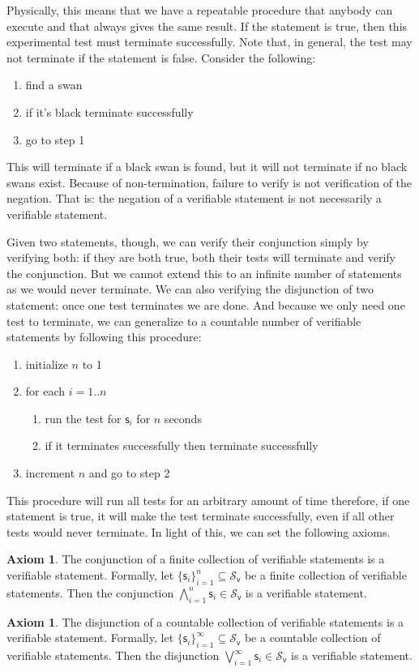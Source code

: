 \documentclass[letterpaper]{article}
\theoremstyle{plain}%
\theoremstyle{definition}
\newtheorem{axiom}[thrm]{Axiom}
\theoremstyle{remark}
\def\vstmtSet{\mathcal{S}_\textsf{v}}
\def\bigAND{\bigwedge}
\def\bigOR{\bigvee}
\newcommand{\stmt}[1][s] {\mathsf{#1}}
\begin{document}
Physically, this means that we have a repeatable procedure that anybody can execute and that always gives the same result. If the statement is true, then this experimental test must terminate successfully. Note that, in general, the test may not terminate if the statement is false. Consider the following:
\begin{enumerate}
	\item find a swan
	\item if it's black terminate successfully
	\item go to step 1
\end{enumerate}
This will terminate if a black swan is found, but it will not terminate if no black swans exist. Because of non-termination, failure to verify is not verification of the negation. That is: the negation of a verifiable statement is not necessarily a verifiable statement.

Given two statements, though, we can verify their conjunction simply by verifying both: if they are both true, both their tests will terminate and verify the conjunction. But we cannot extend this to an infinite number of statements as we would never terminate. We can also verifying the disjunction of two statement: once one test terminates we are done. And because we only need one test to terminate, we can generalize to a countable number of verifiable statements by following this procedure:
\begin{enumerate}
	\item initialize $n$ to 1
	\item for each $i=1..n$
	\begin{enumerate}
		\item run the test for $\stmt_i$ for $n$ seconds
		\item if it terminates successfully then terminate successfully
	\end{enumerate}
	\item increment $n$ and go to step 2
\end{enumerate}
This procedure will run all tests for an arbitrary amount of time therefore, if one statement is true, it will make the test terminate successfully, even if all other tests would never terminate. In light of this, we can set the following axioms.

\begin{axiom}\label{ax_verifiable_AND}
	The conjunction of a finite collection of verifiable statements is a verifiable statement. Formally, let $\{\stmt_i\}_{i=1}^{n} \subseteq \vstmtSet$ be a finite collection of verifiable statements. Then the conjunction $\bigAND\limits_{i=1}^{n} \stmt_i \in \vstmtSet$ is a verifiable statement.
\end{axiom}
	\begin{axiom}\label{ax_verifiable_OR}
	The disjunction of a countable collection of verifiable statements is a verifiable statement. Formally, let $\{\stmt_i\}_{i=1}^{\infty} \subseteq \vstmtSet$ be a countable collection of verifiable statements. Then the disjunction $\bigOR\limits_{i=1}^{\infty} \stmt_i \in \vstmtSet$ is a verifiable statement.
\end{axiom}
\end{document}
